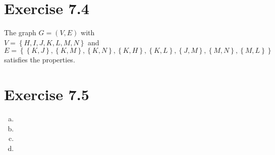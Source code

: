 \documentclass{article} %
\newcommand{\homeworkNumber}{7}
\begin{document}
\section*{Exercise \homeworkNumber.4}
The graph \( G = (V,E) \) with \\
\( V = \left\{ H, I, J, K, L, M, N  \right\}  \) and \\
\( E = \left\{ \left\{ K, J \right\}, \left\{ K,M \right\}, \left\{ K,N \right\}, \left\{ K,H \right\}, \left\{ K,L \right\}, \left\{ J,M \right\}, \left\{ M,N \right\}, \left\{ M,L \right\}   \right\} \) \\
satisfies the properties.



\section*{Exercise \homeworkNumber.5}

\begin{enumerate}[(a)]
	\item
	\item
	\item
	\item
\end{enumerate}
\end{document}
